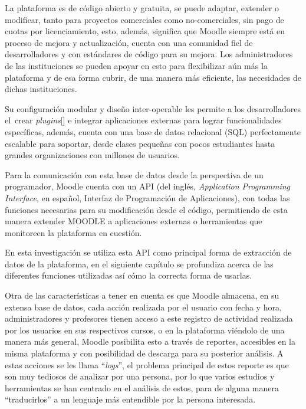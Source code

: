 La plataforma es de código abierto y gratuita, se puede adaptar, extender o modificar, tanto para proyectos comerciales como no-comerciales, sin pago de cuotas por licenciamiento, esto, además, significa que Moodle siempre está en proceso de mejora y actualización, cuenta con una comunidad fiel de desarrolladores y con estándares de código para su mejora. Los administradores de las instituciones se pueden apoyar en esto para flexibilizar aún más la plataforma y de esa forma cubrir, de una manera más eficiente, las necesidades de dichas instituciones.  


Su configuración modular y diseño inter-operable les permite a los desarrolladores el crear \textit{plugins}[\cite{Moodle_Plugins}] e integrar aplicaciones externas para lograr funcionalidades específicas, además, cuenta con una base de datos relacional (SQL) perfectamente escalable para soportar, desde clases pequeñas con pocos estudiantes hasta grandes organizaciones con millones de usuarios.  


Para la comunicación con esta base de datos desde la perspectiva de un programador, Moodle cuenta con un API (del inglés, \textit{Application Programming Interface}, en español, Interfaz de Programación de Aplicaciones), con todas las funciones necesarias para su modificación desde el código, permitiendo de esta manera extender MOODLE a aplicaciones externas o herramientas que monitoreen la plataforma en cuestión.  


En esta investigación se utiliza esta API como principal forma de extracción de datos de la plataforma, en el siguiente capítulo se profundiza acerca de las diferentes funciones utilizadas así cómo la correcta forma de usarlas.  


Otra de las características a tener en cuenta es que Moodle almacena, en su extensa base de datos, cada acción realizada por el usuario con fecha y hora, administradores y profesores tienen acceso a este registro de actividad realizada por los usuarios en sus respectivos cursos, o en la plataforma viéndolo de una manera más general, Moodle posibilita esto a través de reportes, accesibles en la misma plataforma y con posibilidad de descarga para su posterior análisis. A estas acciones se les llama ``\textit{logs}'', el problema principal de estos reporte es que son muy tediosos de analizar por una persona, por lo que varios estudios y herramientas se han centrado en el análisis de estos, para de alguna manera ``traducirlos'' a un lenguaje más entendible por la persona interesada.

